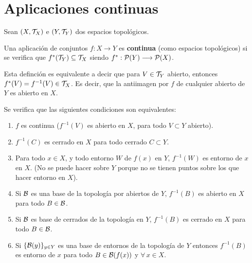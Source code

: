 \chapter{Aplicaciones continuas} \justifying
Sean $(X, \mathcal{T}_X)$ e $(Y, \mathcal{T}_Y)$ dos espacios topol\'ogicos.
\begin{defi}
    Una aplicaci\'on de conjuntos $f: X\longrightarrow Y$ es \textbf{continua} (como espacios topol\'ogicos) si se verifica que $f^*(\mathcal{T}_Y) \subseteq \mathcal{T}_X$ siendo $f^* : \mathcal{P}(Y) \longrightarrow \mathcal{P}(X)$. 
\end{defi}
\begin{obs}
    Esta definci\'on es equivalente a decir que para $V \in \mathcal{T}_Y$ abierto, entonces $f^*(V) = f^{-1}(V) \in \mathcal{T}_X$. Es decir, que la antiimagen por $f$ de cualquier abierto de $Y$ es abierto en $X$. 
\end{obs}
\begin{prop}
    Se verifica que las siguientes condiciones son equivalentes:
    \begin{enumerate}
        \item $f$ es continua ($f^{-1}(V)$ es abierto en $X$, para todo $V\subset Y$  abierto). 
        \item $f^{-1}(C)$ es cerrado en $X$ para todo cerrado $C\subset Y$.
        \item Para todo $x\in X$, y todo entorno $W$ de $f(x)$ en $Y$, $f^{-1}(W)$ es entorno de $x$ en $X$. (No se puede hacer sobre $Y$ porque no se tienen puntos sobre los que hacer entorno en $X$).
        \item Si $\mathcal{B}$ es una base de la topolog\'ia por abiertos de $Y$, $f^{-1}(B) $ es abierto en $X$ para todo $B \in \mathcal{B}$. 
        \item Si $\mathcal{B}$ es base de cerrados de la topolog\'ia en $Y$, $f^{-1}(B)$ es cerrado en $X$ para todo $B\in \mathcal{B}$.
        \item Si $\{\mathcal{B}(y)\}_{y \in Y}$ es una base de entornos de la topolog\'ia de $Y$ entonces $f^{-1}(B)$ es entorno de $x$ para todo $B \in \mathcal{B}(f(x))$ y $\forall \, x \in X$.  
    \end{enumerate}
\end{prop}
